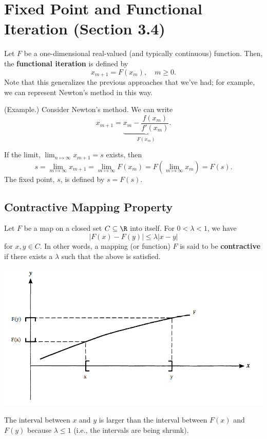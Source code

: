 \documentclass[letterpaper]{article}
\begin{document}
\section{Fixed Point and Functional Iteration (Section 3.4)}
Let $F$ be a one-dimensional real-valued (and typically continuous) function. Then, the \textbf{functional iteration} is defined by 
\[x_{m + 1} = F(x_m), \quad m \geq 0.\]
Note that this generalizes the previous approaches that we've had; for example, we can represent Newton's method in this way. 

\begin{mdframed}
    (Example.) Consider Newton's method. We can write 
    \[x_{m + 1} = \underbrace{x_{m} - \frac{f(x_m)}{f'(x_m)}}_{F(x_m)}.\]
\end{mdframed}
If the limit, $\lim_{n \mapsto \infty} x_{m + 1} = s$ exists, then 
\[s = \lim_{m \mapsto \infty} x_{m + 1} = \lim_{m \mapsto \infty} F(x_m) = F\left(\lim_{m \mapsto \infty} x_m\right) = F(s).\]
The fixed point, $s$, is defined by $\boxed{s = F(s)}.$

\subsection{Contractive Mapping Property}
Let $F$ be a map on a closed set $C \subseteq \R$ into itself. For $0 < \lambda < 1$, we have \[\boxed{|F(x) - F(y)| \leq \lambda |x - y|}\] for $x, y \in C$. In other words, a mapping (or function) $F$ is said to be \textbf{contractive} if there exists a $\lambda$ such that the above is satisfied.
\begin{center}
    \includegraphics[scale=0.8]{../assets/contractive.png}
\end{center}
The interval between $x$ and $y$ is larger than the interval between $F(x)$ and $F(y)$ because $\lambda \leq 1$ (i.e., the intervals are being shrunk).
\end{document}
